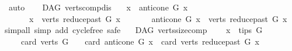 \begin{isabellebody}
\ auto\isanewline
{}\isamarkupfalse%
%
\endisatagproof
{\isafoldproof}%
%
\isadelimproof
\ \isanewline
%
\endisadelimproof
\isanewline
{}\isamarkupfalse%
\ {\isacharparenleft}{\kern0pt}\ DAG{\isacharparenright}{\kern0pt}\ verts{\isacharunderscore}{\kern0pt}comp{\isacharunderscore}{\kern0pt}dis{\isacharcolon}{\kern0pt}\isanewline
\ \ \ {\isachardoublequoteopen}{\isacharbraceleft}{\kern0pt}x{\isacharbraceright}{\kern0pt}\ {\isasyminter}\ {\isacharparenleft}{\kern0pt}anticone\ G\ x{\isacharparenright}{\kern0pt}\ {\isacharequal}{\kern0pt}\ {\isacharbraceleft}{\kern0pt}{\isacharbraceright}{\kern0pt}{\isachardoublequoteclose}\ \isanewline
\ \ \ \ \ {\isachardoublequoteopen}\ {\isacharbraceleft}{\kern0pt}x{\isacharbraceright}{\kern0pt}\ {\isasyminter}\ {\isacharparenleft}{\kern0pt}verts\ {\isacharparenleft}{\kern0pt}reduce{\isacharunderscore}{\kern0pt}past\ G\ x{\isacharparenright}{\kern0pt}{\isacharparenright}{\kern0pt}\ {\isacharequal}{\kern0pt}\ {\isacharbraceleft}{\kern0pt}{\isacharbraceright}{\kern0pt}{\isachardoublequoteclose}\isanewline
\ \ \ \ \ {\isachardoublequoteopen}anticone\ G\ x\ {\isasyminter}\ {\isacharparenleft}{\kern0pt}verts\ {\isacharparenleft}{\kern0pt}reduce{\isacharunderscore}{\kern0pt}past\ G\ x{\isacharparenright}{\kern0pt}{\isacharparenright}{\kern0pt}\ {\isacharequal}{\kern0pt}\ {\isacharbraceleft}{\kern0pt}{\isacharbraceright}{\kern0pt}{\isachardoublequoteclose}\isanewline
%
\isadelimproof
%
\endisadelimproof
%
\isatagproof
{}\isamarkupfalse%
{\isacharparenleft}{\kern0pt}simp{\isacharunderscore}{\kern0pt}all{\isacharcomma}{\kern0pt}\ simp\ add{\isacharcolon}{\kern0pt}\ cycle{\isacharunderscore}{\kern0pt}free{\isacharcomma}{\kern0pt}\ safe{\isacharparenright}{\kern0pt}\ \isamarkupfalse%
%
\endisatagproof
{\isafoldproof}%
%
\isadelimproof
\isanewline
%
\endisadelimproof
\isanewline
\isanewline
{}\isamarkupfalse%
\ {\isacharparenleft}{\kern0pt}\ DAG{\isacharparenright}{\kern0pt}\ verts{\isacharunderscore}{\kern0pt}size{\isacharunderscore}{\kern0pt}comp{\isacharcolon}{\kern0pt}\isanewline
\ \ \ \ {\isachardoublequoteopen}x\ {\isasymin}\ tips\ G{\isachardoublequoteclose}\isanewline
\ \ \ \ {\isachardoublequoteopen}card\ {\isacharparenleft}{\kern0pt}verts\ G{\isacharparenright}{\kern0pt}\ {\isacharequal}{\kern0pt}\ {}\ {\isacharplus}{\kern0pt}\ card\ {\isacharparenleft}{\kern0pt}anticone\ G\ x{\isacharparenright}{\kern0pt}\ {\isacharplus}{\kern0pt}\ card\ {\isacharparenleft}{\kern0pt}verts\ {\isacharparenleft}{\kern0pt}reduce{\isacharunderscore}{\kern0pt}past\ G\ x{\isacharparenright}{\kern0pt}{\isacharparenright}{\kern0pt}{\isachardoublequoteclose}\isanewline

\end{isabellebody}
